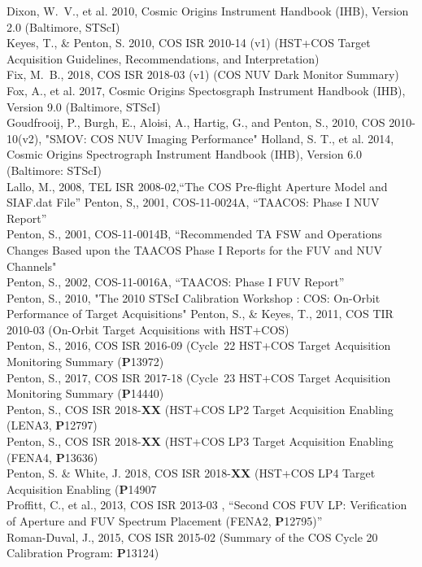 \documentclass{stsci_report}
\newcommand{\pid}[1]{{\bf P}#1}
\begin{document}
\small
Dixon, W.~V., et al. 2010, Cosmic Origins Instrument Handbook (IHB), Version 2.0 (Baltimore, STScI)\\
Keyes, T., \& Penton, S. 2010, COS ISR 2010-14 (v1) (HST+COS Target Acquisition Guidelines, Recommendations, and Interpretation)\\
Fix, M.~B., 2018, COS ISR 2018-03 (v1) (COS NUV Dark Monitor Summary)\\
Fox, A., et al. 2017, Cosmic Origins Spectosgraph Instrument Handbook (IHB), Version 9.0 (Baltimore, STScI)\\
Goudfrooij, P., Burgh, E., Aloisi, A., Hartig, G., and Penton, S., 2010, COS 2010-10(v2), "SMOV: COS NUV Imaging Performance"
Holland, S. T., et al. 2014, Cosmic Origins Spectrograph Instrument Handbook (IHB), Version 6.0 (Baltimore: STScI)\\
Lallo, M., 2008, TEL ISR 2008-02,``The COS Pre-flight Aperture Model and SIAF.dat File''
Penton, S,, 2001, COS-11-0024A, ``TAACOS: Phase I NUV Report''\\
Penton, S., 2001, COS-11-0014B, ``Recommended TA FSW and Operations Changes Based upon the TAACOS Phase I Reports for the FUV and NUV Channels"\\
Penton, S., 2002, COS-11-0016A, ``TAACOS: Phase I FUV Report''\\
Penton, S., 2010, "The 2010 STScI Calibration Workshop : COS: On-Orbit Performance of Target Acquisitions"
Penton, S., \& Keyes, T., 2011, COS TIR 2010-03 (On-Orbit Target Acquisitions with HST+COS)\\
Penton, S., 2016, COS ISR 2016-09 (Cycle~22 HST+COS Target Acquisition Monitoring Summary (\pid{13972})\\
Penton, S., 2017, COS ISR 2017-18 (Cycle~23 HST+COS Target Acquisition Monitoring Summary (\pid{14440})\\
Penton, S., COS ISR 2018-{\bf XX} (HST+COS LP2 Target Acquisition Enabling (LENA3, \pid{12797})\\
Penton, S., COS ISR 2018-{\bf XX} (HST+COS LP3 Target Acquisition Enabling (FENA4, \pid{13636})\\
Penton, S. \& White, J. 2018, COS ISR 2018-{\bf XX} (HST+COS LP4 Target Acquisition Enabling (\pid{14907}\\
Proffitt, C., et al., 2013, COS ISR 2013-03 , ``Second COS FUV LP: Verification of Aperture and FUV Spectrum Placement (FENA2, \pid{12795})''\\
Roman-Duval, J., 2015, COS ISR 2015-02 (Summary of the COS Cycle 20 Calibration Program: \pid{13124})\\
\end{document}
